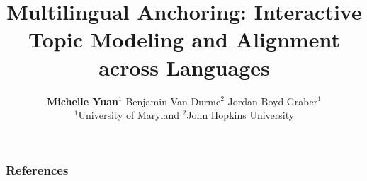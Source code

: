 \documentclass{beamer}
\title[NIPS]{Multilingual Anchoring: Interactive Topic Modeling and Alignment across Languages}
\author{
\small{
\textbf{Michelle Yuan}$^1$ Benjamin Van Durme$^2$  Jordan Boyd-Graber$^1$
} \\\vspace{10px}
\footnotesize{$^1$University of Maryland $^2$John Hopkins University}
}
\begin{document}
\begin{frame}
    \titlepage
\end{frame}












\begin{frame}[t, allowframebreaks]
\frametitle{References}

\small

\end{frame}
\end{document}
